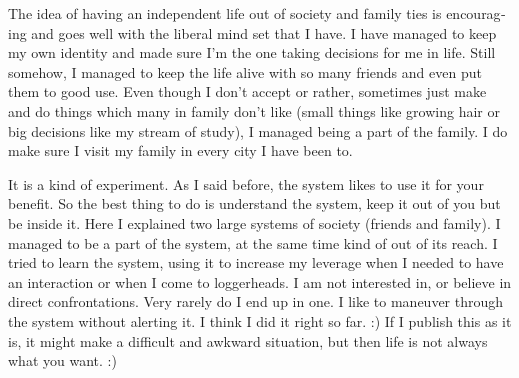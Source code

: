 \begin{english}
The idea of having an independent life out of society and family ties is encouraging and goes 
well with the liberal mind set that I have. I have managed to keep my own identity and made sure I'm the 
one taking decisions for me in life. Still somehow, I managed to keep the life alive with so many 
friends and even put them to good use. Even though I don't accept or rather, sometimes just make and do 
things which many in family don't like (small things like growing hair or big decisions like my 
stream of study), I managed being a part of the family. I do make sure I visit my family in every 
city I have been to. 

It is a kind of experiment. As I said before, the system likes to use it for your benefit. So the best 
thing to do is understand the system, keep it out of you but be inside it. Here I explained two 
large systems of society (friends and family). I managed to be a part of the system, at the same time 
kind of out of its reach. I tried to learn the system, using it to increase my leverage when I needed to have 
an interaction or when I come to loggerheads. I am not interested in, or believe in direct
confrontations. Very rarely do I end up in one. I like to maneuver through the system without 
alerting it. I think I did it right so far. :) If I publish this as it is, it might make a difficult 
and awkward situation, but then life is not always what you want. :)
\end{english}
\newpage 
